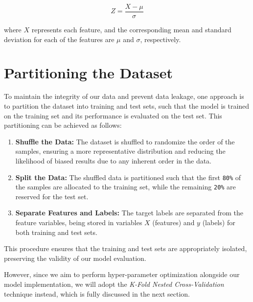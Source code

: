 \begin{equation}
    Z = \frac{X-\mu}{\sigma}
\end{equation}

where $X$ represents each feature, and the corresponding mean and standard deviation for each of the features are $\mu$ and $\sigma$, respectively.

\section{Partitioning the Dataset}

To maintain the integrity of our data and prevent data leakage, one approach is to partition the dataset into training and test sets, such that the model is trained on the training set and its performance is evaluated on the test set. This partitioning can be achieved as follows:

\begin{enumerate}
    \item \textbf{Shuffle the Data:} The dataset is shuffled to randomize the order of the samples, ensuring a more representative distribution and reducing the likelihood of biased results due to any inherent order in the data.
    \item \textbf{Split the Data:} The shuffled data is partitioned such that the first \texttt{80\%} of the samples are allocated to the training set, while the remaining \texttt{20\%} are reserved for the test set.
    \item \textbf{Separate Features and Labels:} The target labels are separated from the feature variables, being stored in variables $X$ (features) and $y$ (labels) for both training and test sets.
\end{enumerate}

This procedure ensures that the training and test sets are appropriately isolated, preserving the validity of our model evaluation.

However, since we aim to perform hyper-parameter optimization alongside our model implementation, we will adopt the \textit{K-Fold Nested Cross-Validation} technique instead, which is fully discussed in the next section.
